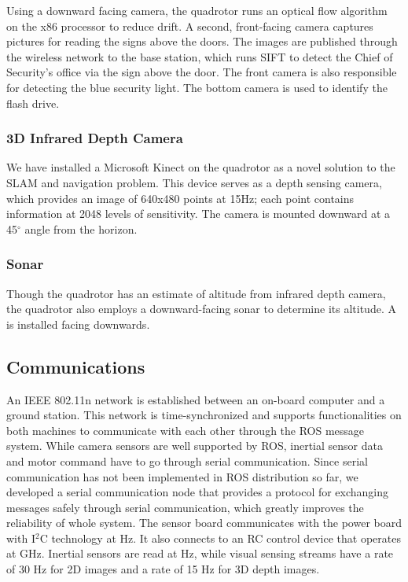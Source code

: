 \documentclass[12pt, letterpaper]{article}
\begin{document}
Using a downward facing camera, the quadrotor runs an optical flow algorithm on the x86 processor to reduce drift.  A second, front-facing camera captures pictures for reading the signs above the doors.  The images are published through the wireless network to the base station, which runs SIFT to detect the Chief of Security's office via the sign above the door. The front camera is also responsible for detecting the blue security light.  The bottom camera is used to identify the flash drive.

\subsubsection{3D Infrared Depth Camera}

We have installed a Microsoft Kinect on the quadrotor as a novel solution to the SLAM and navigation problem. This device serves as a depth sensing camera, which provides an image of 640x480 points at 15Hz; each point contains information at 2048 levels of sensitivity. The camera is mounted downward at a 45$^\circ$ angle from the horizon.

\subsubsection{Sonar}

Though the quadrotor has an estimate of altitude from infrared depth camera, the quadrotor also employs a downward-facing sonar to determine its altitude. A  is installed facing downwards.

\subsection{Communications}

An IEEE 802.11n network is established between an on-board computer and a ground station. This network is time-synchronized and supports functionalities on both machines to communicate with each other through the ROS message system. While camera sensors are well supported by ROS, inertial sensor data and motor command have to go through serial communication. Since serial communication has not been implemented in ROS distribution so far, we developed a serial communication node that provides a protocol for exchanging messages safely through serial communication, which greatly improves the reliability of whole system. The sensor board communicates with the power board with I$^2$C technology at  Hz. It also connects to an RC control device that operates at  GHz. Inertial sensors are read at  Hz, while visual sensing streams have a rate of 30 Hz for 2D images and a rate of 15 Hz for 3D depth images.
\end{document}
